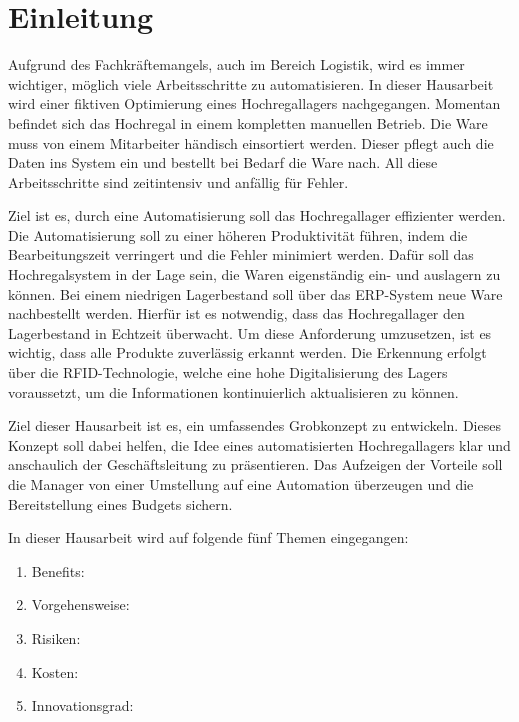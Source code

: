 \chapter{Einleitung}

Aufgrund des Fachkräftemangels, auch im Bereich Logistik, wird es immer wichtiger, möglich viele Arbeitsschritte zu automatisieren.
In dieser Hausarbeit wird einer fiktiven Optimierung eines Hochregallagers nachgegangen. 
Momentan befindet sich das Hochregal in einem kompletten manuellen Betrieb. Die Ware muss von einem Mitarbeiter händisch einsortiert werden. Dieser pflegt auch die Daten ins System ein und bestellt bei Bedarf die Ware nach.
All diese Arbeitsschritte sind zeitintensiv und anfällig für Fehler.

Ziel ist es, durch eine Automatisierung soll das Hochregallager effizienter werden. Die Automatisierung soll zu einer höheren Produktivität führen, indem die Bearbeitungszeit verringert und die Fehler minimiert werden. Dafür soll das Hochregalsystem in der Lage sein, die Waren eigenständig ein- und auslagern zu können. 
Bei einem niedrigen Lagerbestand soll über das ERP-System neue Ware nachbestellt werden. Hierfür ist es notwendig, dass das Hochregallager den Lagerbestand in Echtzeit überwacht. Um diese Anforderung umzusetzen, ist es wichtig, dass alle Produkte zuverlässig erkannt werden. Die Erkennung erfolgt über die RFID-Technologie, welche eine hohe Digitalisierung des Lagers voraussetzt, um die Informationen kontinuierlich aktualisieren zu können.

Ziel dieser Hausarbeit ist es, ein umfassendes Grobkonzept zu entwickeln. Dieses Konzept soll dabei helfen, die Idee eines automatisierten Hochregallagers klar und anschaulich der Geschäftsleitung zu präsentieren. 
Das Aufzeigen der Vorteile soll die Manager von einer Umstellung auf eine Automation überzeugen und die Bereitstellung eines Budgets sichern.

In dieser Hausarbeit wird auf folgende fünf Themen eingegangen:
\begin{enumerate}
	\item Benefits:
	\item Vorgehensweise:
	\item Risiken:
	\item Kosten:
	\item Innovationsgrad:
\end{enumerate}